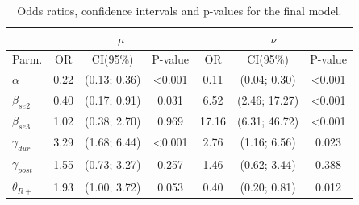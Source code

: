 \documentclass[
  ignorenonframetext,
  serif,
  professionalfont,
  usenames,
  dvipsnames,
  aspectratio = 169]{beamer}
\begin{document}
\begin{frame}{}
\protect\hypertarget{section-1}{}
\begin{table}[h]
    \centering
    \caption{Odds ratios, confidence intervals and p-values for the final  model.}
    \begin{tabular}{lcccccc}
        \hline
        & \multicolumn{3}{c}{$\mu$}                                                                                                      & \multicolumn{3}{c}{$\nu$}                                     \\ \hline
        \multicolumn{1}{l|}{Parm.}                    & OR                   & CI(95\%)                           & \multicolumn{1}{c|}{P-value}                                & OR                    & CI(95\%)     & P-value         \\ \hline
        \multicolumn{1}{l|}{$\alpha$}                 & {\color[HTML]{000000} 0.22} & {\color[HTML]{000000} (0.13; 0.36)} & \multicolumn{1}{c|}{{\color[HTML]{000000} \textless{}0.001}} & {\color[HTML]{000000} 0.11}  & (0.04; 0.30)  & \textless{}0.001 \\
        \multicolumn{1}{l|}{$\beta_{se2}$}            & {\color[HTML]{000000} 0.40} & {\color[HTML]{000000} (0.17; 0.91)} & \multicolumn{1}{c|}{{\color[HTML]{000000} 0.031}} & {\color[HTML]{000000} 6.52}  & (2.46; 17.27) & \textless{}0.001 \\
        \multicolumn{1}{l|}{$\beta_{se3}$}            & {\color[HTML]{000000} 1.02} & {\color[HTML]{000000} (0.38; 2.70)} & \multicolumn{1}{c|}{{\color[HTML]{000000} 0.969}}            & {\color[HTML]{000000} 17.16} & (6.31; 46.72) & \textless{}0.001 \\
        \multicolumn{1}{l|}{$\gamma_{dur}$}           & {\color[HTML]{000000} 3.29} & {\color[HTML]{000000} (1.68; 6.44)} & \multicolumn{1}{c|}{{\color[HTML]{000000} \textless{}0.001}} & {\color[HTML]{000000} 2.76}  & (1.16; 6.56)  & 0.023 \\
        \multicolumn{1}{l|}{$\gamma_{post}$}          & {\color[HTML]{000000} 1.55} & {\color[HTML]{000000} (0.73; 3.27)} & \multicolumn{1}{c|}{{\color[HTML]{000000} 0.257}}            & {\color[HTML]{000000} 1.46}  & (0.62; 3.44)  & 0.388            \\
        \multicolumn{1}{l|}{$\theta_{R+}$}            & {\color[HTML]{000000} 1.93} & {\color[HTML]{000000} (1.00; 3.72)} & \multicolumn{1}{c|}{{\color[HTML]{000000} 0.053}}            & {\color[HTML]{000000} 0.40}  & (0.20; 0.81)  & 0.012 \\

\end{tabular}
\end{table}
\end{frame}
\end{document}
